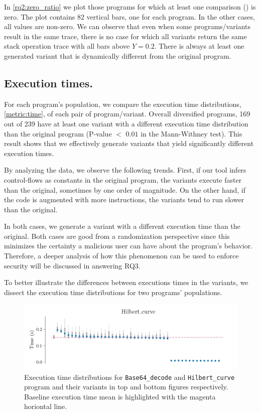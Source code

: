 



In \autoref{rq2:zero_ratio} we plot those programs for which at least one comparison (\DTW) is zero. The plot contains 82 vertical bars, one for each program. In the other cases, all \DTW values are non-zero. We can observe that even when some programs/variants result in the same trace, there is no case for which all variants return the same stack operation trace with all bars above $Y=0.2$. There is always at least one generated variant that is dynamically different from the original program. 

\newcommand{\zerocountprogs}{82\xspace}

\subsection*{Execution times.}

For each program's population, we compare the execution time distributions, \autoref{metric:time}, of each pair of program/variant.
Overall diversified programs, 169 out of 239 have at least one variant with a different execution time distribution than the original program (P-value $<$ $0.01$ in the Mann-Withney test). This result shows that we effectively generate variants that yield significantly different execution times.

By analyzing the data, we observe the following trends. First, if our tool infers control-flows as constants in the original program, the variants execute faster than the original, sometimes by one order of magnitude. On the other hand, if the code is augmented with more instructions, the variants tend to run slower than the original. 

In both cases, we generate a variant with a different execution time than the original. Both cases are good from a randomization perspective since this minimizes the certainty a malicious user can have about the program's behavior. Therefore, a deeper analysis of how this phenomenon can be used to enforce security will be discussed in answering RQ3.

To better illustrate the differences between executions times in the variants, we dissect the execution time distributions for two programs' populations. 


\begin{figure}[h]
    \centering
    \includegraphics[width=\linewidth]{plots/hilbert_curve.pdf}
    \caption{Execution time distributions for \texttt{Base64\_decode} and \texttt{Hilbert\_curve} program and their variants in top and bottom figures respectively. Baseline execution time mean is highlighted with the magenta horiontal line. }
    \label{rq3:perf}
\end{figure}


